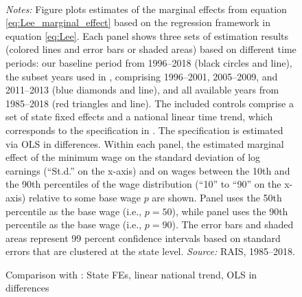 \begin{figure}[!htb]
  \centering
  \caption{Comparison with \citet{Haanwinckel2020_appendix}: State FEs, linear national trend, OLS in differences\label{app_fig_haanwinckel_state_trend_1_ntrend_2_ols_diff}}
  \prefigvspace
  \hspace*{\fill}%
  \centerhfill[\qquad\qquad\qquad\qquad\qquad]
  \hspace*{\fill}
  \\
  \postfigvspace
  \begin{minipage}[t]{1\columnwidth}%
    \begin{spacing}{0.75}
      \emph{\scriptsize{}Notes:}{\scriptsize{} Figure plots estimates of the marginal effects from equation \eqref{eq:Lee_marginal_effect} based on the regression framework in equation \eqref{eq:Lee}. Each panel shows three sets of estimation results (colored lines and error bars or shaded areas) based on different time periods: our baseline period from 1996--2018 (black circles and line), the subset years used in , comprising 1996--2001, 2005--2009, and 2011--2013 (blue diamonds and line), and all available years from 1985--2018 (red triangles and line). The included controls comprise a set of state fixed effects and a national linear time trend, which corresponds to the specification in . The specification is estimated via OLS in differences. Within each panel, the estimated marginal effect of the minimum wage on the standard deviation of log earnings (``St.d.'' on the x-axis) and on wages between the 10th and the 90th percentiles of the wage distribution (``10'' to ``90'' on the x-axis) relative to some base wage $p$ are shown. Panel  uses the 50th percentile as the base wage (i.e., $p=50$), while panel  uses the 90th percentile as the base wage (i.e., $p=90$). The error bars and shaded areas represent 99 percent confidence intervals based on standard errors that are clustered at the state level. %
      \emph{\scriptsize{}Source: } RAIS, 1985--2018.}
    \end{spacing}
  \end{minipage}
\end{figure}


